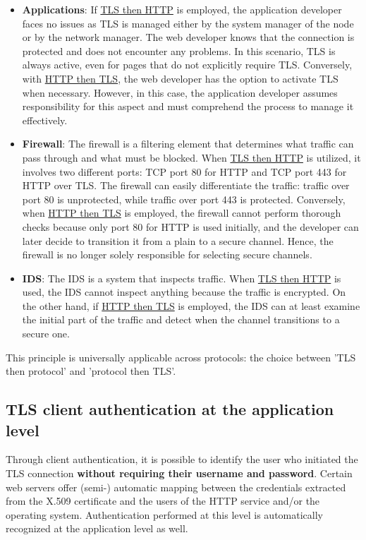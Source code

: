\begin{itemize}
    \item \textbf{Applications}: If \underline{TLS then HTTP} is employed, the application developer faces no issues as TLS is managed either by the system manager of the node or by the network manager. The web developer knows that the connection is protected and does not encounter any problems. In this scenario, TLS is always active, even for pages that do not explicitly require TLS. Conversely, with \underline{HTTP then TLS}, the web developer has the option to activate TLS when necessary. However, in this case, the application developer assumes responsibility for this aspect and must comprehend the process to manage it effectively.

    \item \textbf{Firewall}: The firewall is a filtering element that determines what traffic can pass through and what must be blocked. When \underline{TLS then HTTP} is utilized, it involves two different ports: TCP port 80 for HTTP and TCP port 443 for HTTP over TLS. The firewall can easily differentiate the traffic: traffic over port 80 is unprotected, while traffic over port 443 is protected. Conversely, when \underline{HTTP then TLS} is employed, the firewall cannot perform thorough checks because only port 80 for HTTP is used initially, and the developer can later decide to transition it from a plain to a secure channel. Hence, the firewall is no longer solely responsible for selecting secure channels.

    \item \textbf{IDS}: The IDS is a system that inspects traffic. When \underline{TLS then HTTP} is used, the IDS cannot inspect anything because the traffic is encrypted. On the other hand, if \underline{HTTP then TLS} is employed, the IDS can at least examine the initial part of the traffic and detect when the channel transitions to a secure one.
\end{itemize}

This principle is universally applicable across protocols: the choice between 'TLS then protocol' and 'protocol then TLS'.


\subsection{TLS client authentication at the application level}

Through client authentication, it is possible to identify the user who initiated the TLS connection \textbf{without requiring their username and password}. Certain web servers offer (semi-) automatic mapping between the credentials extracted from the X.509 certificate and the users of the HTTP service and/or the operating system. Authentication performed at this level is automatically recognized at the application level as well.

